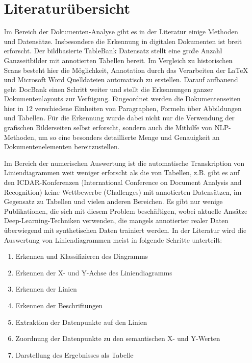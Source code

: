 \chapter{Literaturübersicht}
\label{ch:literaturübersicht}

Im Bereich der Dokumenten-Analyse gibt es in der Literatur einige Methoden und Datensätze. Insbesondere die Erkennung in digitalen Dokumenten ist breit erforscht. Der bildbasierte TableBank \cite{li2019tablebank} Datensatz stellt eine große Anzahl Ganzseitbilder mit annotierten Tabellen bereit. Im Vergleich zu historischen Scans besteht hier die Möglichkeit, Annotation durch das Verarbeiten der LaTeX und Microsoft Word Quelldateien automatisch zu erstellen. Darauf aufbauend geht DocBank \cite{li2020docbank} einen Schritt weiter und stellt die Erkennungen ganzer Dokumentenlayouts zur Verfügung. Eingeordnet werden die Dokumentenseiten hier in 12 verschiedene Einheiten von Paragraphen, Formeln über Abbildungen und Tabellen. Für die Erkennung wurde dabei nicht nur die Verwendung der grafischen Bilderseiten selbst erforscht, sondern auch die Mithilfe von NLP-Methoden, um so eine besonders detaillierte Menge und Genauigkeit an Dokumentenelementen bereitzustellen.

Im Bereich der numerischen Auswertung ist die automatische Transkription von Liniendiagrammen weit weniger erforscht als die von Tabellen, z.B. gibt es auf den ICDAR-Konferenzen (International Conference on Document Analysis and Recognition) keine Wettbewerbe (Challenges) mit annotierten Datensätzen, im Gegensatz zu Tabellen und vielen anderen Bereichen. Es gibt nur wenige Publikationen, die sich mit diesem Problem beschäftigen, wobei aktuelle Ansätze \cite{P2023LineEXDE, lee2023matgdmaterialsgraphdigitizer} Deep-Learning-Techniken verwenden, die mangels annotierter realer Daten überwiegend mit synthetischen Daten trainiert werden. In der Literatur wird die Auswertung von Liniendiagrammen meist in folgende Schritte unterteilt:


\begin{enumerate}[itemsep=0pt, topsep=0pt]
    \item Erkennen und Klassifizieren des Diagramms
    \item Erkennen der X- und Y-Achse des Liniendiagramms
    \item Erkennen der Linien
    \item Erkennen der Beschriftungen
    \item Extraktion der Datenpunkte auf den Linien
    \item Zuordnung der Datenpunkte zu den semantischen X- und Y-Werten
    \item Darstellung des Ergebnisses als Tabelle
\end{enumerate}

